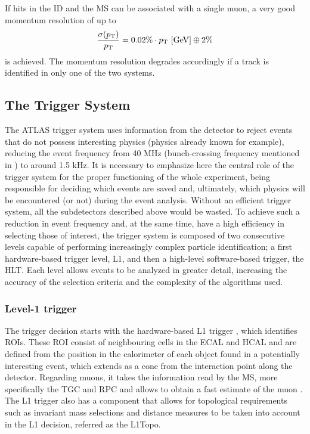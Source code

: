 If hits in the \ac{ID} and the \ac{MS} can be associated with a single muon, a very good momentum resolution of up to
\begin{equation}
    \frac{\sigma(p_{\text{T}})}{p_{\text{T}}} = 
    0.02\% \cdot p_{\text{T}}~[\text{GeV}] \oplus 2\%
\end{equation}
is achieved. The momentum resolution degrades accordingly if a track is identified in only one of the two systems.






\subsection{The Trigger System}



The \ac{ATLAS} trigger system \cite{ATLAS-Trigger-Performance-2010,ATLAS-Trigger-Performance-2015,ATLAS-Trigger-Performance-Run2} uses information from the detector to reject events that do not possess interesting physics (physics already known for example), reducing the event frequency from 40 MHz (bunch-crossing frequency mentioned in \Sect{\ref{sec:atlas:LHC}}) to around 1.5 kHz. It is necessary to emphasize here the central role of the trigger system for the proper functioning of the whole experiment, being responsible for deciding which events are saved and, ultimately, which physics will be encountered (or not) during the event analysis. Without an efficient trigger system, all the subdetectors described above would be wasted. To achieve such a reduction in event frequency and, at the same time, have a high efficiency in selecting those of interest, the trigger system is composed of two consecutive levels capable of performing increasingly complex particle identification; a first hardware-based trigger level, \ac{L1}, and then a high-level software-based trigger, the \ac{HLT}. Each level allows events to be analyzed in greater detail, increasing the accuracy of the selection criteria and the complexity of the algorithms used.


\subsubsection{Level-1 trigger}

The trigger decision starts with the hardware-based \ac{L1} trigger \cite{ATLAS-L1Trigger}, which identifies \acp{ROI}. These \ac{ROI} consist of neighbouring cells in the \ac{ECAL} and \ac{HCAL} and are defined from the position in the calorimeter of each object found in a potentially interesting event, which extends as a cone from the interaction point along the detector.
Regarding muons, it takes the information read by the \ac{MS}, more specifically the \ac{TGC} and \ac{RPC} and allows to obtain a fast estimate of the muon \pt.
The \ac{L1} trigger also has a component that allows for topological requirements such as invariant mass selections and distance measures to be taken into account in the \ac{L1} decision, referred as the \ac{L1Topo}.

